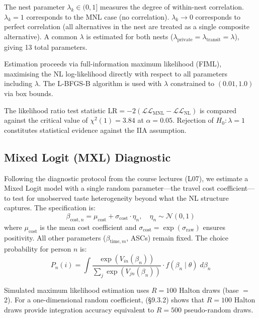 \documentclass[12pt,a4paper]{article}
\begin{document}
The nest parameter $\lambda_k \in (0, 1]$ measures the degree of within-nest correlation. $\lambda_k = 1$ corresponds to the MNL case (no correlation). $\lambda_k \to 0$ corresponds to perfect correlation (all alternatives in the nest are treated as a single composite alternative). A common $\lambda$ is estimated for both nests ($\lambda_{\text{private}} = \lambda_{\text{transit}} = \lambda$), giving 13 total parameters.

Estimation proceeds via full-information maximum likelihood (FIML), maximising the NL log-likelihood directly with respect to all parameters including $\lambda$. The L-BFGS-B algorithm is used with $\lambda$ constrained to $(0.01, 1.0)$ via box bounds.

The likelihood ratio test statistic $\text{LR} = -2(\mathcal{L}\mathcal{L}_{\text{MNL}} - \mathcal{L}\mathcal{L}_{\text{NL}})$ is compared against the critical value of $\chi^2(1) = 3.84$ at $\alpha = 0.05$. Rejection of $H_0: \lambda = 1$ constitutes statistical evidence against the IIA assumption.

\subsection{Mixed Logit (MXL) Diagnostic}

Following the diagnostic protocol from the course lectures (L07), we estimate a Mixed Logit model with a single random parameter---the travel cost coefficient---to test for unobserved taste heterogeneity beyond what the NL structure captures. The specification is:
\begin{equation}
\beta_{\text{cost},n} = \mu_{\text{cost}} + \sigma_{\text{cost}} \cdot \eta_n, \quad \eta_n \sim \mathcal{N}(0, 1)
\label{eq:mxlcost}
\end{equation}
where $\mu_{\text{cost}}$ is the mean cost coefficient and $\sigma_{\text{cost}} = \exp(\sigma_{\text{raw}})$ ensures positivity. All other parameters ($\beta_{\text{time},m}$, ASCs) remain fixed. The choice probability for person $n$ is:
\begin{equation}
P_n(i) = \int \frac{\exp(V_{in}(\beta_n))}{\sum_j \exp(V_{jn}(\beta_n))} \cdot f(\beta_n \mid \theta) \; d\beta_n
\label{eq:mxlprob}
\end{equation}

Simulated maximum likelihood estimation uses $R = 100$ Halton draws (base $=$ 2). For a one-dimensional random coefficient, \citet{train2009} (\S 9.3.2) shows that $R = 100$ Halton draws provide integration accuracy equivalent to $R = 500$ pseudo-random draws.
\end{document}
